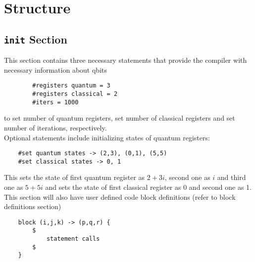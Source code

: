\chapter{Structure}\label{ch:struct}


\section{\texttt{init} Section}
This section contains three necessary statements that provide the compiler with necessary information about qbits
\begin{lstlisting}
        #registers quantum = 3
        #registers classical = 2
        #iters = 1000
\end{lstlisting}
to set number of quantum registers, set number of classical registers and set number of iterations, respectively. \\

Optional statements include initializing states of quantum registers:
\begin{lstlisting}
    #set quantum states -> (2,3), (0,1), (5,5)
    #set classical states -> 0, 1
\end{lstlisting}
This sets the state of first quantum register as $2+3i$, second one as $i$ and third one as $5+5i$ and sets the state of first classical register as 0 and second one as 1.\\

This section will also have user defined code block definitions (refer to block definitions section)
\begin{lstlisting}                                                                                                                                                                             
    block (i,j,k) -> (p,q,r) {                                                                                                                                                                 
        $                                                                                                                                                                                      
            statement calls                                                                                                                                                                    
        $                                                                                                                                                                                      
    }                                                                                                                                                                                          
\end{lstlisting}                                                                                                                                                                               
                                                                                                                                                                                                   
